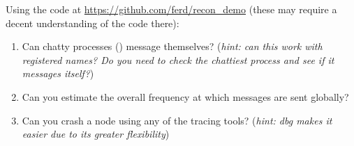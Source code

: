 Using the code at \href{https://github.com/ferd/recon\_demo}{https://github.com/ferd/recon\_demo} (these may require a decent understanding of the code there):

\begin{enumerate}
	\item Can chatty processes () message themselves? (\emph{hint: can this work with registered names? Do you need to check the chattiest process and see if it messages itself?})
	\item Can you estimate the overall frequency at which messages are sent globally?
	\item Can you crash a node using any of the tracing tools? (\emph{hint: dbg makes it easier due to its greater flexibility})
\end{enumerate}

